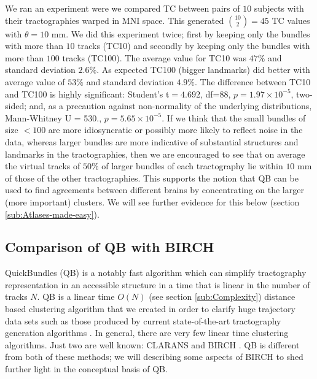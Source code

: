 \documentclass[preprint,authoryear,a4paper,10pt,onecolumn]{elsarticle}
\begin{document}
We ran an experiment were we compared TC between pairs of $10$ subjects
with their tractographies warped in MNI space. This generated
$\binom{10}{2}=45$ TC values with $\theta=$$10$ mm. We did this
experiment twice; first by keeping only the bundles with more than $10$
tracks (TC10) and secondly by keeping only the bundles with more than
$100$ tracks (TC100). The average value for TC10 was $47\%$ and standard
deviation $2.6\%$. As expected TC100 (bigger landmarks) did better with
average value of $53\%$ and standard deviation $4.9\%$. The difference
between TC10 and TC100 is highly significant: Student's t$=4.692$,
df=88, $p=1.97\times10^{-5}$, two-sided; and, as a precaution against
non-normality of the underlying distributions, Mann-Whitney U = 530.,
$p=5.65\times10^{-5}$. If we think that the small bundles of size $<100$
are more idiosyncratic or possibly more likely to reflect noise in the
data, whereas larger bundles are more indicative of substantial
structures and landmarks in the tractographies, then we are encouraged
to see that on average the virtual tracks of $50\%$ of larger bundles of
each tractography lie within $10$ mm of those of the other
tractographies. This supports the notion that QB can be used to find
agreements between different brains by concentrating on the larger (more
important) clusters. We will see further evidence for this below
(section \ref{sub:Atlases-made-easy}).


\subsection{Comparison of QB with BIRCH}

QuickBundles (QB) is a notably fast algorithm which can simplify
tractography representation in an accessible structure in a time that is
linear in the number of tracks $N$. QB is a linear time $O(N)$ (see
section \ref{sub:Complexity}) distance based clustering algorithm that
we created in order to clarify huge trajectory data sets such as those
produced by current state-of-the-art tractography generation algorithms
\citep{Parker2003,WWS+08}. In general, there are very few linear time
clustering algorithms. Just two are well known: CLARANS
\citep{ng2002clarans} and BIRCH \citep{zhang1997birch}. QB is different
from both of these methods; we will describing some
aspects of BIRCH to shed further light in the conceptual basis of QB.
\end{document}
